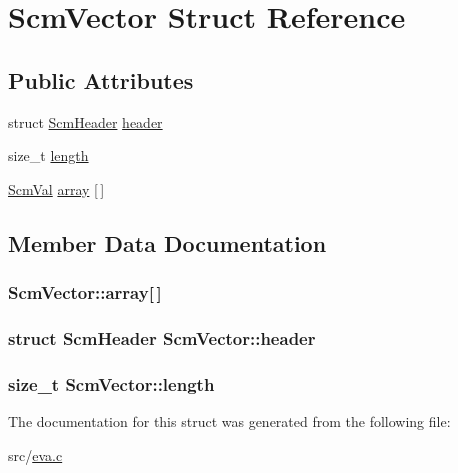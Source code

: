 \hypertarget{struct_scm_vector}{\section{Scm\-Vector Struct Reference}
\label{struct_scm_vector}
}
\subsection*{Public Attributes}
\begin{DoxyCompactItemize}
\item 
struct \hyperlink{struct_scm_header}{Scm\-Header} \hyperlink{struct_scm_vector_ad09fe880dd1c25d16b85f9f8d2b3df9a}{header}
\item 
size\-\_\-t \hyperlink{struct_scm_vector_a160f4537ab42fe4c926425acd7148de3}{length}
\item 
\hyperlink{eva_8h_a9e754b130d398cb7a4000c8c7a046427}{Scm\-Val} \hyperlink{struct_scm_vector_a3e7fd66828965e0d43d8fe0cf6f1334d}{array} \mbox{[}$\,$\mbox{]}
\end{DoxyCompactItemize}


\subsection{Member Data Documentation}
\hypertarget{struct_scm_vector_a3e7fd66828965e0d43d8fe0cf6f1334d}{
\subsubsection[{array}]{ Scm\-Vector\-::array\mbox{[}$\,$\mbox{]}}}\label{struct_scm_vector_a3e7fd66828965e0d43d8fe0cf6f1334d}
\hypertarget{struct_scm_vector_ad09fe880dd1c25d16b85f9f8d2b3df9a}{
\subsubsection[{header}]{\setlength{\rightskip}{0pt plus 5cm}struct {\bf Scm\-Header} Scm\-Vector\-::header}}\label{struct_scm_vector_ad09fe880dd1c25d16b85f9f8d2b3df9a}
\hypertarget{struct_scm_vector_a160f4537ab42fe4c926425acd7148de3}{
\subsubsection[{length}]{\setlength{\rightskip}{0pt plus 5cm}size\-\_\-t Scm\-Vector\-::length}}\label{struct_scm_vector_a160f4537ab42fe4c926425acd7148de3}


The documentation for this struct was generated from the following file\-:\begin{DoxyCompactItemize}
\item 
src/\hyperlink{eva_8c}{eva.\-c}\end{DoxyCompactItemize}
